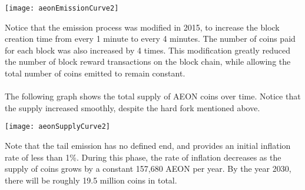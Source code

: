 \begin{center}
	\texttt{[image: aeonEmissionCurve2]}
\end{center}
Notice that the emission process was modified in 2015, to increase the block creation time from every 1 minute to every 4 minutes. The number of coins paid for each block was also increased by 4 times. This modification greatly reduced the number of block reward transactions on the block chain, while allowing the total number of coins emitted to remain constant.\\
\\
The following graph shows the total supply of AEON coins over time. Notice that the supply increased smoothly, despite the hard fork mentioned above.

\begin{center}
	\texttt{[image: aeonSupplyCurve2]}
\end{center}
Note that the tail emission has no defined end, and provides an initial inflation rate of less than 1\%. During this phase, the rate of inflation decreases as the supply of coins grows by a constant 157,680 AEON per year. By the year 2030, there will be roughly 19.5 million coins in total.

